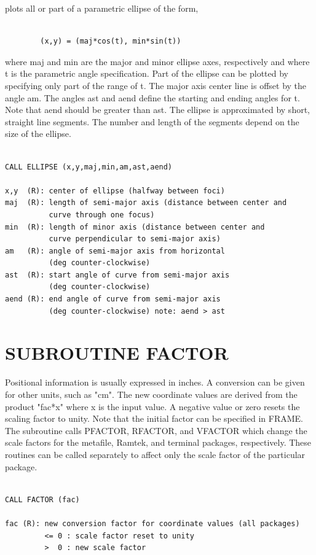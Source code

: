 \documentclass[11pt]{report}
\begin{document}
 plots all or part of a parametric ellipse of the form,
\begin{verbatim}

        (x,y) = (maj*cos(t), min*sin(t))

\end{verbatim}
where maj and min are the major and minor ellipse axes, respectively
and where t is the parametric angle specification.  Part of the ellipse
can be plotted by specifying only part of the range of t.
The major axis center line is offset by the angle am.
The angles ast and aend define the starting and ending
angles for t.  Note that aend should be greater than ast.
The ellipse is approximated by short, straight line segments.  The number
and length of the segments depend on the size of the ellipse.
\begin{verbatim}

CALL ELLIPSE (x,y,maj,min,am,ast,aend)

x,y  (R): center of ellipse (halfway between foci)
maj  (R): length of semi-major axis (distance between center and
          curve through one focus)
min  (R): length of minor axis (distance between center and
          curve perpendicular to semi-major axis)
am   (R): angle of semi-major axis from horizontal
          (deg counter-clockwise)
ast  (R): start angle of curve from semi-major axis
          (deg counter-clockwise)
aend (R): end angle of curve from semi-major axis
          (deg counter-clockwise) note: aend > ast
\end{verbatim}

\section{SUBROUTINE FACTOR}

Positional information is usually expressed in inches.  A conversion 
can be given for other units, such as "cm". The new coordinate values are
derived from the product "fac*x" where x is the input value.
A negative value or zero resets the
scaling factor to unity.  Note that the initial factor can be specified
in FRAME.  The subroutine  calls PFACTOR, RFACTOR, and VFACTOR which
change the scale factors for the metafile, Ramtek, and terminal
packages, respectively.  These routines can be called separately to 
affect only the scale factor of the particular package.
\begin{verbatim}

CALL FACTOR (fac)

fac (R): new conversion factor for coordinate values (all packages)
         <= 0 : scale factor reset to unity
         >  0 : new scale factor
\end{verbatim}
\end{document}
